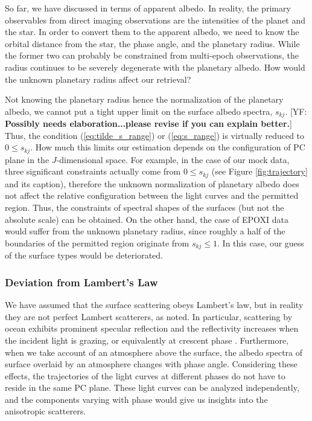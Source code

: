 \documentclass[iop,numberedappendix,apj]{emulateapj}
\def\memoYF#1{\color{red}[YF: {\bf #1}]\color{black}}
\begin{document}
So far, we have discussed in terms of apparent albedo. 
In reality, the primary observables from direct imaging observations are the intensities of the planet and the star. 
In order to convert them to the apparent albedo, we need to know the orbital distance from the star, the phase angle, and the planetary radius. 
While the former two can probably be constrained from multi-epoch observations, the radius continues to be severely degenerate with the planetary albedo. 
How would the unknown planetary radius affect our retrieval? 

Not knowing the planetary radius hence the normalization of the planetary albedo, we cannot put a tight upper limit on the surface albedo spectra, $s_{kj}$. \memoYF{Possibly needs elaboration...please revise if you can explain better.} 
Thus, the condition (\ref{eq:tilde_s_range}) or (\ref{eq:s_range}) is virtually reduced to $0 \leq s_{kj}$. 
How much this limits our estimation depends on the configuration of PC plane in the $J$-dimensional space. 
For example, in the case of our mock data, three significant constraints actually come from $0 \leq s_{kj}$ (see Figure \ref{fig:trajectory} and its caption), therefore the unknown normalization of planetary albedo does not affect the relative configuration between the light curves and the permitted region. 
Thus, the constraints of spectral shapes of the surfaces (but not the absolute scale) can be obtained. 
On the other hand, the case of EPOXI data would suffer from the unknown planetary radius, since roughly a half of the boundaries of the permitted region originate from $ s_{kj} \leq 1$. 
In this case, our guess of the surface types would be deteriorated. 


\subsubsection{Deviation from Lambert's Law}
\label{ss:deviate_Lambert}

We have assumed that the surface scattering obeys Lambert's law, but in reality they are not perfect Lambert scatterers, as noted. 
In particular, scattering by ocean exhibits prominent specular reflection and the reflectivity increases when the incident light is grazing, or equivalently at crescent phase \citep[e.g.,][]{Williams2008,Robinson2010,Robinson2014}. 
Furthermore, when we take account of an atmosphere above the surface, the albedo spectra of surface overlaid by an atmosphere changes with phase angle.  
Considering these effects, the trajectories of the light curves at different phases do not have to reside in the same PC plane. 
These light curves can be analyzed independently, and the components varying with phase would give us insights into the anisotropic scatterers. 
\end{document}
